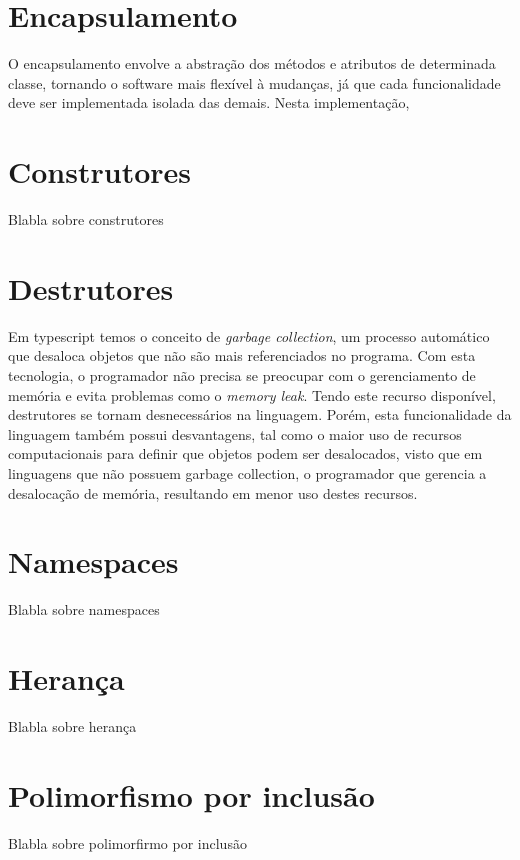 \documentclass[rel_mlp]{iiufrgs}
\numberwithin{figure}{chapter}
\begin{document}
\section{Encapsulamento}

O encapsulamento envolve a abstração dos métodos e atributos de determinada classe, tornando o software mais flexível à mudanças, já que cada funcionalidade deve ser implementada isolada das demais. Nesta implementação, 

\section{Construtores}

Blabla sobre construtores

\section{Destrutores}

Em typescript temos o conceito de \textit{garbage collection}, um processo automático que desaloca objetos que não são mais referenciados no programa. Com esta tecnologia, o programador não precisa se preocupar com o gerenciamento de memória e evita problemas como o \textit{memory leak}. Tendo este recurso disponível, destrutores se tornam desnecessários na linguagem. Porém, esta funcionalidade da linguagem também possui desvantagens, tal como o maior uso de recursos computacionais para definir que objetos podem ser desalocados, visto que em linguagens que não possuem garbage collection, o programador que gerencia a desalocação de memória, resultando em menor uso destes recursos.

\section{Namespaces}

Blabla sobre namespaces

\section{Herança}

Blabla sobre herança

\section{Polimorfismo por inclusão}

Blabla sobre polimorfirmo por inclusão
\end{document}
